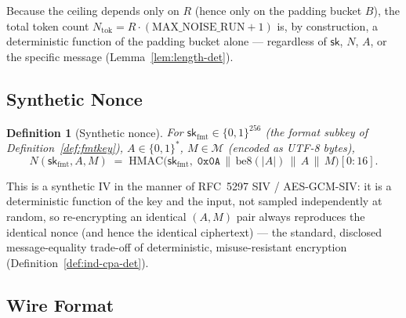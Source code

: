\documentclass[11pt,a4paper]{article}
\newtheorem{definition}[theorem]{Definition}
\begin{document}
Because the ceiling depends only on $R$ (hence only on the padding bucket
$B$), the total token count $N_{\mathrm{tok}} = R\cdot(\mathrm{MAX\_NOISE\_RUN}+1)$
is, by construction, a deterministic function of the padding bucket
alone — regardless of $\mathsf{sk}$, $N$, $A$, or the specific message
(Lemma~\ref{lem:length-det}).

\subsection{Synthetic Nonce}
\label{sec:synthnonce}

\begin{definition}[Synthetic nonce]\label{def:synthnonce}
For $\mathsf{sk}_{\mathrm{fmt}}\in\{0,1\}^{256}$ (the format subkey of
Definition~\ref{def:fmtkey}), $A\in\{0,1\}^{*}$, $M\in\mathcal{M}$
(encoded as UTF-8 bytes),
\[
  N(\mathsf{sk}_{\mathrm{fmt}}, A, M) \;=\; \mathrm{HMAC}\bigl(\mathsf{sk}_{\mathrm{fmt}},\;
    \texttt{0x0A} \,\|\, \mathrm{be8}(|A|) \,\|\, A \,\|\, M\bigr)[0{:}16].
\]
\end{definition}

This is a synthetic IV in the manner of RFC~5297 SIV / AES-GCM-SIV: it is
a deterministic function of the key and the input, not sampled
independently at random, so re-encrypting an identical $(A,M)$ pair always
reproduces the identical nonce (and hence the identical ciphertext) —
the standard, disclosed message-equality trade-off of deterministic,
misuse-resistant encryption (Definition~\ref{def:ind-cpa-det}).

\subsection{Wire Format}
\label{sec:wire-format}
\end{document}
